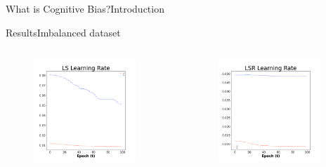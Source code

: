\documentclass[
	aspectratio=169,	%
	onlytextwidth,		%
	t,					%
	]{beamer}
\begin{document}
\begin{frame}[fragile]{What is Cognitive Bias?}{Introduction}
\begin{frame}[fragile]{Results}{Imbalanced dataset}
\begin{columns}
			\begin{column}[T]{0.33\textwidth}
				\begin{figure}
					\includegraphics[width=0.9\textwidth]{myfigs/LS_i.png}
				\end{figure}
			\end{column}
			
			\begin{column}[T]{0.33\textwidth}
				\begin{figure}
					\includegraphics[width=0.9\textwidth]{myfigs/LSR_i.png}
				\end{figure}
			\end{column}
			

\end{columns}
\end{frame}
\end{frame}
\end{document}
